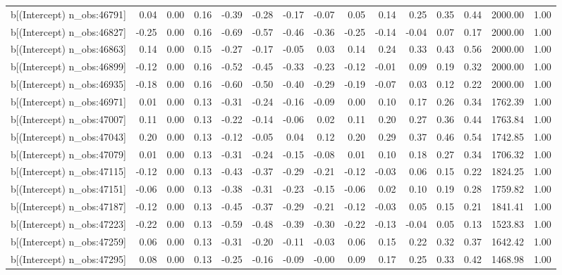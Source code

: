 \begin{table}[ht]
\begin{tabular}{rrrrrrrrrrrrrrr}
  b[(Intercept) n\_obs:46791] & 0.04 & 0.00 & 0.16 & -0.39 & -0.28 & -0.17 & -0.07 & 0.05 & 0.14 & 0.25 & 0.35 & 0.44 & 2000.00 & 1.00 \\ 
  b[(Intercept) n\_obs:46827] & -0.25 & 0.00 & 0.16 & -0.69 & -0.57 & -0.46 & -0.36 & -0.25 & -0.14 & -0.04 & 0.07 & 0.17 & 2000.00 & 1.00 \\ 
  b[(Intercept) n\_obs:46863] & 0.14 & 0.00 & 0.15 & -0.27 & -0.17 & -0.05 & 0.03 & 0.14 & 0.24 & 0.33 & 0.43 & 0.56 & 2000.00 & 1.00 \\ 
  b[(Intercept) n\_obs:46899] & -0.12 & 0.00 & 0.16 & -0.52 & -0.45 & -0.33 & -0.23 & -0.12 & -0.01 & 0.09 & 0.19 & 0.32 & 2000.00 & 1.00 \\ 
  b[(Intercept) n\_obs:46935] & -0.18 & 0.00 & 0.16 & -0.60 & -0.50 & -0.40 & -0.29 & -0.19 & -0.07 & 0.03 & 0.12 & 0.22 & 2000.00 & 1.00 \\ 
  b[(Intercept) n\_obs:46971] & 0.01 & 0.00 & 0.13 & -0.31 & -0.24 & -0.16 & -0.09 & 0.00 & 0.10 & 0.17 & 0.26 & 0.34 & 1762.39 & 1.00 \\ 
  b[(Intercept) n\_obs:47007] & 0.11 & 0.00 & 0.13 & -0.22 & -0.14 & -0.06 & 0.02 & 0.11 & 0.20 & 0.27 & 0.36 & 0.44 & 1763.84 & 1.00 \\ 
  b[(Intercept) n\_obs:47043] & 0.20 & 0.00 & 0.13 & -0.12 & -0.05 & 0.04 & 0.12 & 0.20 & 0.29 & 0.37 & 0.46 & 0.54 & 1742.85 & 1.00 \\ 
  b[(Intercept) n\_obs:47079] & 0.01 & 0.00 & 0.13 & -0.31 & -0.24 & -0.15 & -0.08 & 0.01 & 0.10 & 0.18 & 0.27 & 0.34 & 1706.32 & 1.00 \\ 
  b[(Intercept) n\_obs:47115] & -0.12 & 0.00 & 0.13 & -0.43 & -0.37 & -0.29 & -0.21 & -0.12 & -0.03 & 0.06 & 0.15 & 0.22 & 1824.25 & 1.00 \\ 
  b[(Intercept) n\_obs:47151] & -0.06 & 0.00 & 0.13 & -0.38 & -0.31 & -0.23 & -0.15 & -0.06 & 0.02 & 0.10 & 0.19 & 0.28 & 1759.82 & 1.00 \\ 
  b[(Intercept) n\_obs:47187] & -0.12 & 0.00 & 0.13 & -0.45 & -0.37 & -0.29 & -0.21 & -0.12 & -0.03 & 0.05 & 0.15 & 0.21 & 1841.41 & 1.00 \\ 
  b[(Intercept) n\_obs:47223] & -0.22 & 0.00 & 0.13 & -0.59 & -0.48 & -0.39 & -0.30 & -0.22 & -0.13 & -0.04 & 0.05 & 0.13 & 1523.83 & 1.00 \\ 
  b[(Intercept) n\_obs:47259] & 0.06 & 0.00 & 0.13 & -0.31 & -0.20 & -0.11 & -0.03 & 0.06 & 0.15 & 0.22 & 0.32 & 0.37 & 1642.42 & 1.00 \\ 
  b[(Intercept) n\_obs:47295] & 0.08 & 0.00 & 0.13 & -0.25 & -0.16 & -0.09 & -0.00 & 0.09 & 0.17 & 0.25 & 0.33 & 0.42 & 1468.98 & 1.00 \\ 

\end{tabular}
\end{table}
